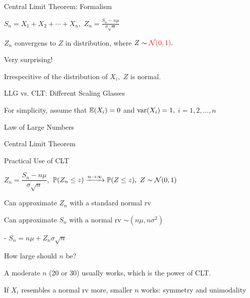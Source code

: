 \begin{frame}{Central Limit Theorem: Formalism}


\plitemsep 0.15in
\bci
\item $S_n = X_1 + X_2 + \cdots + X_n,$ \hspace{1cm} $\displaystyle Z_n = \frac{S_n - n\mu}{\sigma \sqrt{n}}$

{
$Z_n$ convergens to $Z$ in distribution,
where $Z \sim {\color{red} \ensuremath{\mathcal N}(0,1)}.$
}

\item<2-> Very surprising!

\item<2-> Irrespecitive of the distribution of $X_i,$ $Z$ is normal.
\eci
\end{frame}

\begin{frame}{LLG vs. CLT: Different Scaling Glasses}


\plitemsep 0.15in
\bci
\item For simplicity, assume that $\mathbb{E}( X_i )=0$ and $\text{var}( X_i ) =1,$ $i=1, 2, \ldots, n$

\item<2-> Law of Large Numbers

\item<3-> Central Limit Theorem
\eci
\end{frame}

\begin{frame}{Practical Use of CLT}

$Z_n = \dfrac{S_n - n\mu}{\sigma \sqrt{n}},$ \hspace{1cm} $\mathbb{P}( Z_n \le z ) \xrightarrow{n \rightarrow \infty} \mathbb{P}( Z \le z ), \ Z \sim \mathcal N(0,1)$

\plitemsep 0.1in
\bci
\item<2-> Can approximate $Z_n$ with a standard normal rv
\item<4-> Can approximate $S_n$ with a normal rv $\sim  (n\mu, n\sigma^2)$

- $S_n = n \mu + Z_n\sigma\sqrt{n}$
\item<5-> How large should $n$ be?
\bci
\item<6-> A moderate $n$ (20 or 30) usually works, which is the power of CLT.

\item<7-> If $X_i$ resembles a normal rv more, smaller $n$ works: symmetry and unimodality\footnotemark
{}
\eci
\eci


\end{frame}


